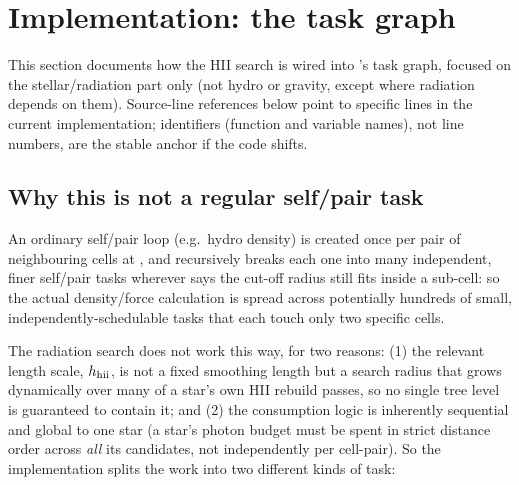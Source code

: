 \section{Implementation: the task graph}
\label{sec:taskgraph}

This section documents how the HII search is wired into \swift's task
graph, focused on the stellar/radiation part only (not hydro or
gravity, except where radiation depends on them). Source-line
references below point to specific lines in the current
implementation; identifiers (function and variable names), not line
numbers, are the stable anchor if the code shifts.

\subsection{Why this is not a regular self/pair task}
\label{sec:not-regular}

An ordinary \swift self/pair loop (e.g.\ hydro density) is created once
per pair of neighbouring cells at , and
 recursively breaks each one into many
independent, finer self/pair tasks wherever
 says the cut-off
radius still fits inside a sub-cell: so the actual density/force
calculation is spread across potentially hundreds of small,
independently-schedulable tasks that each touch only two specific
cells.

The radiation search does not work this way, for two reasons: (1) the
relevant length scale, $h_{\rm hii}$, is not a fixed smoothing length
but a search radius that grows dynamically over many of a star's own
HII rebuild passes, so no single tree level is guaranteed to contain
it; and (2) the
consumption logic is inherently sequential and global to one star (a
star's photon budget must be spent in strict distance order across
\emph{all} its candidates, not independently per cell-pair). So the
implementation splits the work into two different kinds of task:

